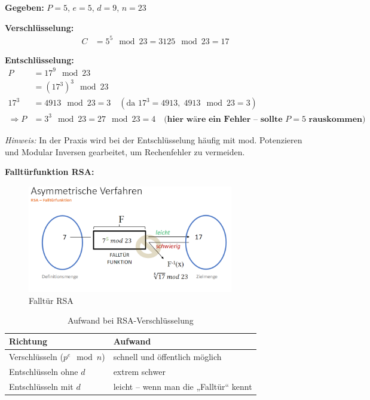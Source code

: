 \documentclass[a4paper,12pt]{article}
\begin{document}
    \vspace{0.5cm}
    
    \begin{tcolorbox}[title=RSA – Beispielrechnung, colback=green!5!white, colframe=green!75!black]
    \textbf{Gegeben:} $P = 5$, $e = 5$, $d = 9$, $n = 23$
    
    \textbf{Verschlüsselung:}
    \begin{align*}
      C &= 5^5 \mod 23 = 3125 \mod 23 = 17
    \end{align*}
    
    \textbf{Entschlüsselung:}
    \begin{align*}
      P &= 17^9 \mod 23 \\
      &= (17^3)^3 \mod 23 \\
      17^3 &= 4913 \mod 23 = 3 \quad (\text{da } 17^3 = 4913, \; 4913 \mod 23 = 3) \\
      \Rightarrow P &= 3^3 \mod 23 = 27 \mod 23 = 4 \quad \textbf{(hier wäre ein Fehler – sollte $P=5$ rauskommen)}
    \end{align*}
    
    \textit{Hinweis:} In der Praxis wird bei der Entschlüsselung häufig mit mod. Potenzieren und Modular Inversen gearbeitet, um Rechenfehler zu vermeiden.
    \end{tcolorbox}

\noindent\textbf{Falltürfunktion RSA:}
\begin{figure}[H]
    \centering
    \includegraphics[width=0.8\textwidth]{bilder/FalltürRSA.png}
    \caption{Falltür RSA}
    \label{fig:FalltürRSA}
\end{figure}

\begin{table}[h!]
    \centering
    \begin{tabular}{@{}ll@{}}
    \toprule
    \textbf{Richtung} & \textbf{Aufwand} \\
    \midrule
    Verschlüsseln ($p^e \mod n$) & schnell und öffentlich möglich \\
    Entschlüsseln ohne $d$ & extrem schwer \\
    Entschlüsseln mit $d$ & leicht – wenn man die „Falltür“ kennt \\
    \bottomrule
    \end{tabular}
    \caption{Aufwand bei RSA-Verschlüsselung}
    \end{table}
\end{document}
